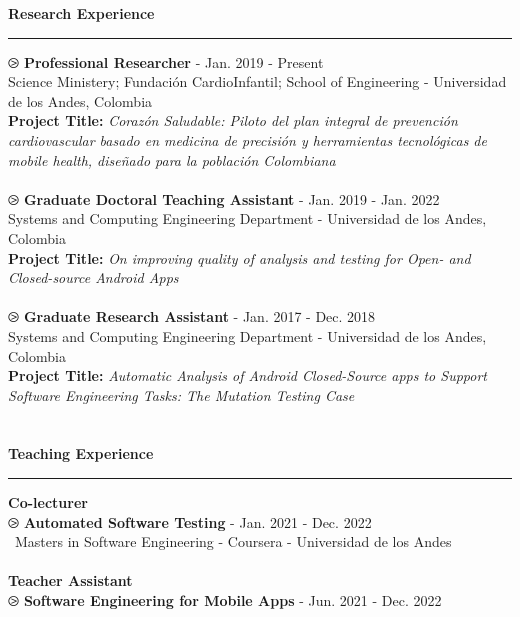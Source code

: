 \documentclass[letterpaper,11pt,oneside]{article}
\begin{document}
\noindent \Large{\textbf{Research Experience}} \\
\vspace{-2ex}
\hrule 
\normalsize
\vspace{2ex}
\noindent $\ogreaterthan$ \textbf{Professional Researcher} - Jan. 2019 - Present\\
{\small Science Ministery; Fundaci\'on CardioInfantil; School of Engineering - Universidad de los Andes, Colombia} \\
{\small \textbf{Project Title: } \textit{Corazón Saludable: Piloto del plan integral de prevención cardiovascular basado en medicina de precisión y herramientas tecnológicas de mobile health, diseñado para la población Colombiana }}\\
\\
\noindent $\ogreaterthan$ \textbf{Graduate Doctoral Teaching Assistant} - Jan. 2019 - Jan. 2022\\
{\small Systems and Computing Engineering Department - Universidad de los Andes, Colombia} \\
{\small \textbf{Project Title: }\textit{On improving quality of analysis and testing for Open- and Closed-source Android Apps}}\\
\\
\noindent $\ogreaterthan$ \textbf{Graduate Research Assistant} - Jan. 2017 - Dec. 2018\\
{\small Systems and Computing Engineering Department - Universidad de los Andes, Colombia } \\
{\small \textbf{Project Title: }\textit{Automatic Analysis of Android Closed-Source apps to Support Software Engineering Tasks: The Mutation Testing Case}}\\
\\
\\
\noindent \Large{\textbf{Teaching Experience}} \\
\vspace{-2ex}
\hrule 
\normalsize
\vspace{2ex}
\noindent \large{\textbf{Co-lecturer}} \\
$\ogreaterthan$ \textbf{Automated Software Testing} -  Jan. 2021 - Dec. 2022\\
 \indent Masters in Software Engineering - Coursera - Universidad de los Andes \\
\\
 \noindent \large{\textbf{Teacher Assistant}}\\
$\ogreaterthan$ \textbf{Software Engineering for Mobile Apps} - Jun. 2021 - Dec. 2022  \\
\end{document}
